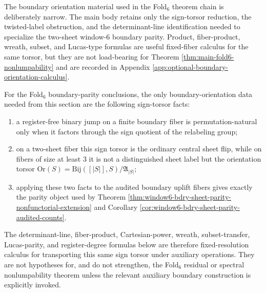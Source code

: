 \begin{remark}\label{rem:bdry-orientation-formulas-role-window6}
The boundary orientation material used in the Fold\(_6\) theorem chain is deliberately narrow.  The main body retains only the sign-torsor reduction, the twisted-label obstruction, and the determinant-line identification needed to specialize the two-sheet window-\(6\) boundary parity.  Product, fiber-product, wreath, subset, and Lucas-type formulas are useful fixed-fiber calculus for the same torsor, but they are not load-bearing for Theorem \ref{thm:main-fold6-nonlumpability} and are recorded in Appendix \ref{app:optional-boundary-orientation-calculus}.
\end{remark}

\begin{proposition}\label{prop:bdry-load-bearing-sign-torsor-reduction}
For the Fold\(_6\) boundary-parity conclusions, the only boundary-orientation data needed from this section are the following sign-torsor facts:
\begin{enumerate}[label=\textup{(\roman*)}]
\item a register-free binary jump on a finite boundary fiber is permutation-natural only when it factors through the sign quotient of the relabeling group;
\item on a two-sheet fiber this sign torsor is the ordinary central sheet flip, while on fibers of size at least \(3\) it is not a distinguished sheet label but the orientation torsor \(\mathrm{Or}(S)=\mathrm{Bij}([|S|],S)/\mathfrak A_{|S|}\);
\item applying these two facts to the audited boundary uplift fibers gives exactly the parity object used by Theorem \ref{thm:window6-bdry-sheet-parity-nonfunctorial-extension} and Corollary \ref{cor:window6-bdry-sheet-parity-audited-counts}.
\end{enumerate}
The determinant-line, fiber-product, Cartesian-power, wreath, subset-transfer, Lucas-parity, and register-degree formulas below are therefore fixed-resolution calculus for transporting this same sign torsor under auxiliary operations.  They are not hypotheses for, and do not strengthen, the Fold\(_6\) residual or spectral nonlumpability theorem unless the relevant auxiliary boundary construction is explicitly invoked.
\end{proposition}

